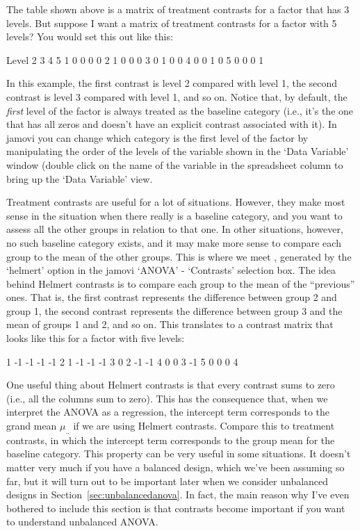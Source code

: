 The table shown above is a matrix of treatment contrasts for a factor that has 3 levels. But suppose I want a matrix of treatment contrasts for a factor with 5 levels? You would set this out like this:
\pagebreak
\begin{rblock1}
Level   2 3 4 5
  1     0 0 0 0
  2     1 0 0 0
  3     0 1 0 0
  4     0 0 1 0
  5     0 0 0 1
\end{rblock1}
In this example, the first contrast is level 2 compared with level 1, the second contrast is level 3 compared with level 1, and so on. Notice that, by default, the {\it first} level of the factor is always treated as the baseline category (i.e., it's the one that has all zeros and doesn't have an explicit contrast associated with it). In jamovi you can change which category is the first level of the factor by manipulating the order of the levels of the variable shown in the `Data Variable' window (double click on the name of the variable in the spreadsheet column to bring up the `Data Variable' view. 


Treatment contrasts are useful for a lot of situations. However, they make most sense in the situation when there really is a baseline category, and you want to assess all the other groups in relation to that one. In other situations, however, no such baseline category exists, and it may make more sense to compare each group to the mean of the other groups. This is where we meet , generated by the `helmert' option in the jamovi `ANOVA' - `Contrasts' selection box. The idea behind Helmert contrasts is to compare each group to the mean of the ``previous'' ones. That is, the first contrast represents the difference between group 2 and group 1, the second contrast represents the difference between group 3 and the mean of groups 1 and 2, and so on. This translates to a contrast matrix that looks like this for a factor with five levels:
\begin{rblock1}
1   -1   -1   -1   -1
2    1   -1   -1   -1
3    0    2   -1   -1
4    0    0    3   -1
5    0    0    0    4
\end{rblock1}
One useful thing about Helmert contrasts is that every contrast sums to zero (i.e., all the columns sum to zero). This has the consequence that, when we interpret the ANOVA as a regression, the intercept term corresponds to the grand mean $\mu_{..}$ if we are using Helmert contrasts. Compare this to treatment contrasts, in which the intercept term corresponds to the group mean for the baseline category. This property can be very useful in some situations. It doesn't matter very much if you have a balanced design, which we've been assuming so far, but it will turn out to be important later when we consider unbalanced designs in Section~\ref{sec:unbalancedanova}. In fact, the main reason why I've even bothered to include this section is that contrasts become important if you want to understand unbalanced ANOVA.
 

